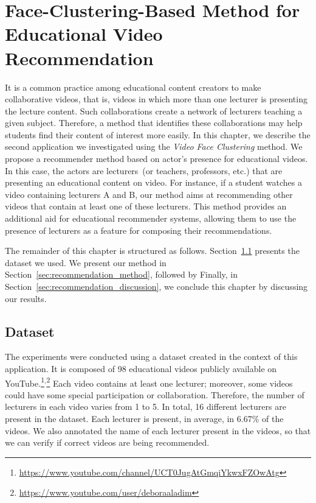 \newpage
\chapter{Face-Clustering-Based Method for Educational Video Recommendation}
\label{chap:educational_recommendation}

It is a common practice among educational content creators to make collaborative videos, that is, videos in which more than one lecturer is presenting the lecture content.
Such collaborations create a network of lecturers teaching a given subject.
Therefore, a method that identifies these collaborations may help students find their content of interest more easily.
In this chapter, we describe the second application we investigated using the \emph{Video Face Clustering} method.
We propose a recommender method based on actor's presence for educational videos. In this case, the actors are lecturers~(or teachers, professors, etc.) that are presenting an educational content on video.
For instance, if a student watches a video containing lecturers A and B, our method aims at recommending other videos that contain at least one of these lecturers. 
This method provides an additional aid for educational recommender systems, allowing them to use the presence of lecturers as a feature for composing their recommendations.

The remainder of this chapter is structured as follows.
Section~\ref{sec:recommendation_dataset} presents the dataset we used.
We present our method in Section~\ref{sec:recommendation_method}, followed by 
Finally, in Section~\ref{sec:recommendation_discussion}, we conclude this chapter by discussing our results.

\section{Dataset}
\label{sec:recommendation_dataset}

The experiments were conducted using a dataset created in the context of this application.
It is composed of 98 educational videos publicly available on YouTube.\footnote{\url{https://www.youtube.com/channel/UCT0JugAtGmqiYkwxFZOwAtg}}$^{,}$\footnote{\url{https://www.youtube.com/user/deboraaladim}}
Each video contains at least one lecturer; moreover, some videos could have some special participation or collaboration. Therefore, the number of lecturers in each video varies from 1 to 5. In total, 16 different lecturers are present in the dataset. Each lecturer is present, in average, in 6.67\% of the videos.
We also annotated the name of each lecturer present in the videos, so that we can verify if correct videos are being recommended.

